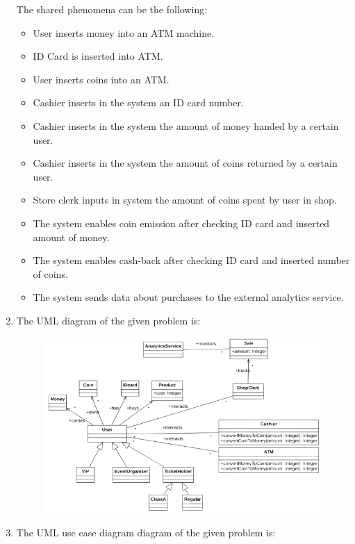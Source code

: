 \documentclass[12pt, a4paper]{report}
\newtheorem[style=M,bodystyle=\normalfont]{theorem}{Theorem}
\newtheorem[style=M,bodystyle=\normalfont]{corollary}{Corollary}
\newtheorem[style=M,bodystyle=\normalfont]{lemma}{Lemma}
\newtheorem[style=M,bodystyle=\normalfont]{definition}{Definition}
\begin{document}
\begin{Answer}[ref=2]
\begin{enumerate}
                The shared phenomena can be the following: 
                \begin{itemize}
                    \item User inserts money into an ATM machine.
                    \item ID Card is inserted into ATM.
                    \item User inserts coins into an ATM.
                    \item Cashier inserts in the system an ID card number.
                    \item Cashier inserts in the system the amount of money handed by a certain user.
                    \item Cashier inserts in the system the amount of coins returned by a certain user.
                    \item Store clerk inputs in system the amount of coins spent by user in shop.
                    \item The system enables coin emission after checking ID card and inserted amount of money.
                    \item The system enables cash-back after checking ID card and inserted number of coins.
                    \item The system sends data about purchases to the external analytics service.
                \end{itemize}
            \item The UML diagram of the given problem is: 
                \begin{figure}[H]
                    \centering
                    \includegraphics[width=0.9\linewidth]{images/UML.png}
                \end{figure}
            \item The UML use case diagram diagram of the given problem is: 

\end{enumerate}
\end{Answer}
\end{document}
